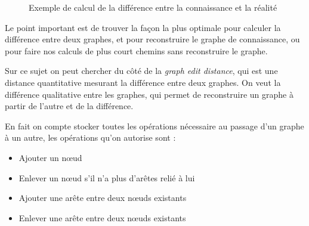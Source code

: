 \documentclass[a4paper]{article}
\begin{document}
\begin{figure}%
  \noindent{}
  \centering
  \caption{Exemple de calcul de la différence entre la connaissance et la
  réalité}
  \label{fig:difference}
\end{figure}%

Le point important est de trouver la façon la plus optimale pour calculer la
différence entre deux graphes, et pour reconstruire le graphe de connaissance,
ou pour faire nos calculs de plus court chemins sans reconstruire le graphe.

Sur ce sujet on peut chercher du côté de la \emph{graph edit distance}, qui est
une distance quantitative mesurant la différence entre deux graphes. On veut la
différence qualitative entre les graphes, qui permet de reconstruire un graphe à
partir de l'autre et de la différence.

En fait on compte stocker toutes les opérations nécessaire au passage d'un
graphe à un autre, les opérations qu'on autorise sont :

\begin{itemize}
  \item Ajouter un nœud
  \item Enlever un nœud s'il n'a plus d'arêtes relié à lui
  \item Ajouter une arête entre deux nœuds existants
  \item Enlever une arête entre deux nœuds existants
\end{itemize}
\end{document}
